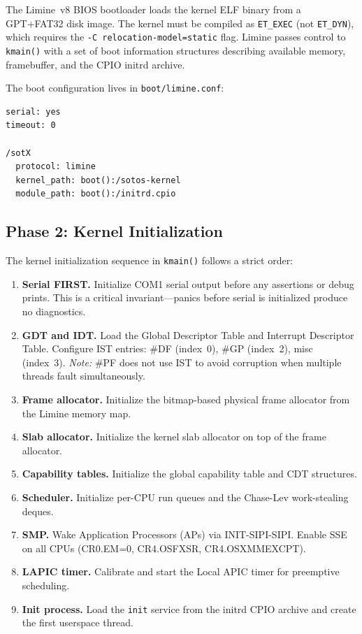 \documentclass[11pt,a4paper,twoside]{report}
\theoremstyle{definition}
\newcommand{\file}[1]{\texttt{#1}}
\begin{document}
The Limine~v8 BIOS bootloader loads the kernel ELF binary from a GPT+FAT32
disk image. The kernel must be compiled as \texttt{ET\_EXEC} (not
\texttt{ET\_DYN}), which requires the \texttt{-C relocation-model=static}
flag. Limine passes control to \texttt{kmain()} with a set of boot
information structures describing available memory, framebuffer, and the
CPIO initrd archive.

The boot configuration lives in \file{boot/limine.conf}:
\begin{lstlisting}[language={},caption={Limine boot configuration (excerpt).}]
serial: yes
timeout: 0

/sotX
  protocol: limine
  kernel_path: boot():/sotos-kernel
  module_path: boot():/initrd.cpio
\end{lstlisting}

\subsection{Phase 2: Kernel Initialization}

The kernel initialization sequence in \texttt{kmain()} follows a strict order:

\begin{enumerate}[leftmargin=1.4em]
  \item \textbf{Serial FIRST.} Initialize COM1 serial output before any
    assertions or debug prints. This is a critical invariant---panics
    before serial is initialized produce no diagnostics.
  \item \textbf{GDT and IDT.} Load the Global Descriptor Table and
    Interrupt Descriptor Table. Configure IST entries: \#DF (index~0),
    \#GP (index~2), misc (index~3). \textit{Note:} \#PF does not use IST
    to avoid corruption when multiple threads fault simultaneously.
  \item \textbf{Frame allocator.} Initialize the bitmap-based physical
    frame allocator from the Limine memory map.
  \item \textbf{Slab allocator.} Initialize the kernel slab allocator on
    top of the frame allocator.
  \item \textbf{Capability tables.} Initialize the global capability table
    and CDT structures.
  \item \textbf{Scheduler.} Initialize per-CPU run queues and the
    Chase-Lev work-stealing deques.
  \item \textbf{SMP.} Wake Application Processors (APs) via INIT-SIPI-SIPI.
    Enable SSE on all CPUs (CR0.EM=0, CR4.OSFXSR, CR4.OSXMMEXCPT).
  \item \textbf{LAPIC timer.} Calibrate and start the Local APIC timer for
    preemptive scheduling.
  \item \textbf{Init process.} Load the \texttt{init} service from the
    initrd CPIO archive and create the first userspace thread.
\end{enumerate}
\end{document}
